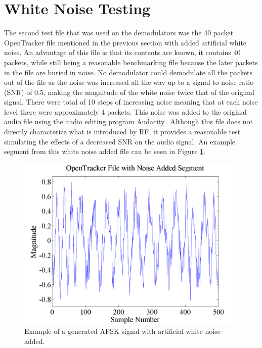 \section{White Noise Testing}
The second test file that was used on the demodulators was the 40 packet OpenTracker file mentioned in the previous section with added artificial white noise. An advantage of this file is that its contents are known, it contains 40 packets, while still being a reasonable benchmarking file because the later packets in the file are buried in noise. No demodulator could demodulate all the packets out of the file as the noise was increased all the way up to a signal to noise ratio (SNR) of 0.5, making the magnitude of the white noise twice that of the original signal. There were total of 10 steps of increasing noise meaning that at each noise level there were approximately 4 packets. This noise was added to the original audio file using the audio editing program Audacity\,\cite{Mazzoni}. Although this file does not directly characterize what is introduced by RF, it provides a reasonable test simulating the effects of a decreased SNR on the audio signal. An example segment from this white noise added file can be seen in Figure \ref{OT3TestwNoiseSegment}.
\begin{figure}
  \centering
	\includegraphics[width=0.75\linewidth]{images/OpenTrackerFilewithNoiseAddedSegment.png} 
	\caption{Example of a generated AFSK signal with artificial white noise added.}
   \label{OT3TestwNoiseSegment}
\end{figure}
 
